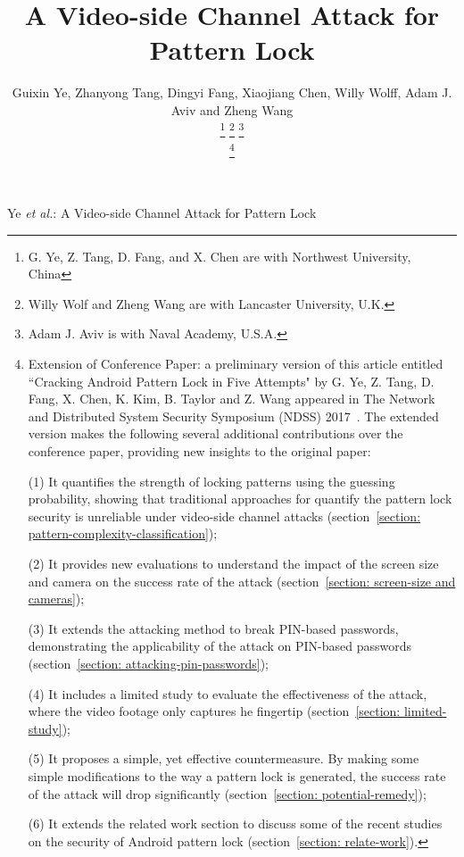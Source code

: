 \documentclass[journal,table,twoside]{IEEEtran}
\begin{document}
\title{A Video-side Channel Attack for Pattern Lock}
\author{Guixin Ye, Zhanyong Tang, Dingyi Fang, Xiaojiang Chen,
        Willy Wolff, Adam J. Aviv and Zheng Wang

    \thanks{G. Ye, Z. Tang, D. Fang, and X. Chen are with Northwest University, China}%
    \thanks{Willy Wolf and Zheng Wang are with Lancaster University, U.K.}
    \thanks{Adam J. Aviv is with Naval Academy, U.S.A.}

    \thanks{
            Extension of Conference Paper: a preliminary version of this article entitled ``Cracking Android Pattern Lock
            in Five Attempts" by G. Ye, Z. Tang, D. Fang, X. Chen, K. Kim, B. Taylor and Z. Wang appeared in
            The Network and Distributed System Security Symposium (NDSS) 2017~\cite{ye2017cracking}.
            The extended version makes the following several additional contributions over the conference
            paper, providing new insights to the original paper:


            (1)	It quantifies the strength of locking patterns using the guessing probability, showing that traditional approaches for quantify the pattern lock security is unreliable under video-side channel attacks (section~\ref{section: pattern-complexity-classification});


            (2)	It provides new evaluations to understand the impact of the screen size and camera on the success rate of the attack (section~\ref{section: screen-size and cameras});


            (3)	It extends the attacking method to break PIN-based passwords, demonstrating the applicability of the attack on PIN-based passwords (section~\ref{section: attacking-pin-passwords});


            (4)	It includes a limited study to evaluate the effectiveness of the attack, where the video footage only captures he fingertip (section~\ref{section: limited-study});


            (5)	It proposes a simple, yet effective countermeasure. By making some simple modifications to the way a pattern lock is generated, the success rate of the attack will drop significantly (section~\ref{section: potential-remedy});


            (6)	It extends the related work section to discuss some of the recent studies on the security of Android pattern lock (section~\ref{section: relate-work}).

    }
}

%
{Ye \MakeLowercase{\textit{et al.}}: A Video-side Channel Attack for Pattern Lock}
\end{document}
